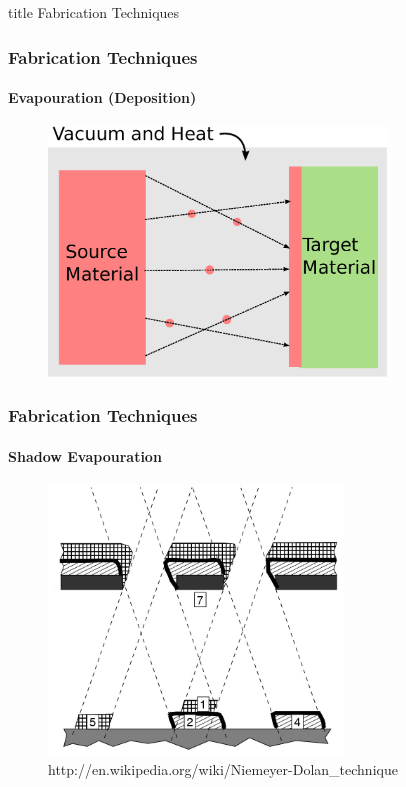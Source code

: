 \documentclass{beamer}
\begin{document}

\begin{frame}
    \vfill
    \centering
    \begin{beamercolorbox}[sep=8pt,center,shadow=true,rounded=true]{title}
        Fabrication Techniques
    \end{beamercolorbox}
    \vfill
\end{frame}


\begin{frame}
    \frametitle{Fabrication Techniques}
    \framesubtitle{Evapouration (Deposition)}
    \begin{figure}[!htb]
        \centering
        \includegraphics[width=0.8\textwidth]{img/evaporation.eps}
    \end{figure}
\end{frame}


\begin{frame}
    \frametitle{Fabrication Techniques}
    \framesubtitle{Shadow Evapouration}
    \begin{figure}[ht!]
        \centering
        \includegraphics[width=0.7\textwidth]{img/shadow-evaporation.png}
        \caption{http://en.wikipedia.org/wiki/Niemeyer-Dolan\_technique}
    \end{figure}
\end{frame}
\end{document}
